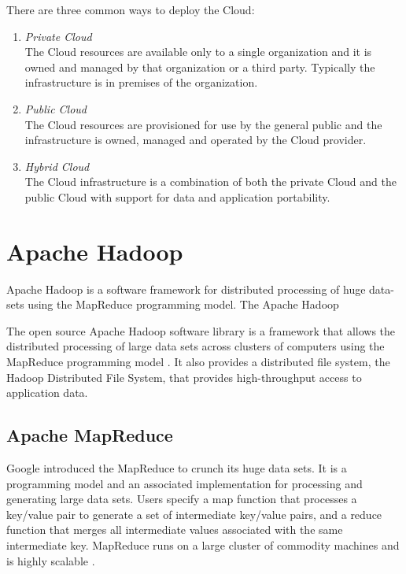 \documentclass[12pt,a4paper]{report}
\begin{document}
There are three common ways to deploy the Cloud:

\begin{enumerate}
 \item \emph{Private Cloud} \\The Cloud resources are available only 
to a single organization and it is owned and managed by 
that organization or a third party. Typically the infrastructure is in premises of the 
organization.
 \item \emph{Public Cloud} \\The Cloud resources are provisioned for use by the general 
public and the infrastructure is owned, managed and operated by the Cloud provider.
  \item \emph{Hybrid Cloud} \\The Cloud infrastructure is a combination of 
both the private Cloud and the public Cloud with support for data and application 
portability.
\end{enumerate}


\section{Apache Hadoop}

Apache Hadoop is a software framework for distributed processing of huge data-sets
using the MapReduce programming model. The Apache Hadoop 

The open source Apache Hadoop software library is a framework that 
allows the distributed processing of large data sets across clusters of 
computers using the MapReduce programming model \cite{website:apache-hadoop}. It also provides 
a distributed ﬁle system, the Hadoop Distributed File System, that provides 
high-throughput access to application data.

\subsection{Apache MapReduce}

Google introduced the MapReduce to crunch its huge data sets. 
It is a programming model and an associated implementation for processing 
and generating large data sets. Users specify a map function that processes a 
key/value pair to generate a set of intermediate key/value pairs, and a reduce 
function that merges all intermediate values associated with the same 
intermediate key. MapReduce runs on a large cluster of commodity machines 
and is highly scalable \cite{dean2008mapreduce}. 
\end{document}
